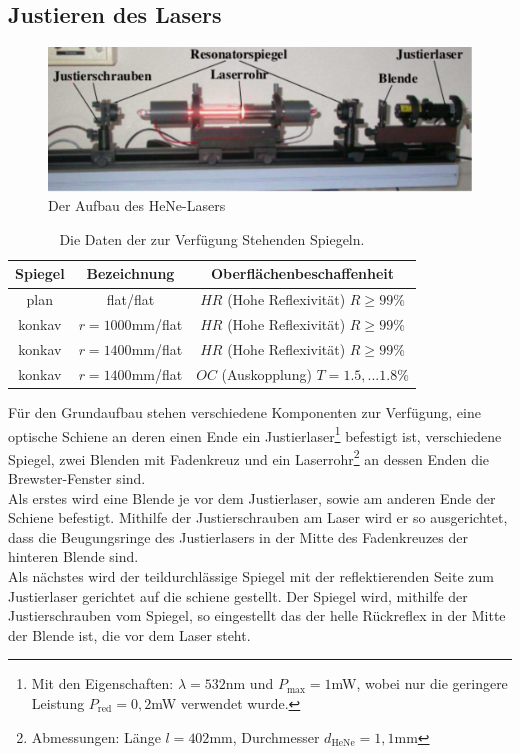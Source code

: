 \subsection{Justieren des Lasers}
\begin{figure}[h!]
\centering
\includegraphics[scale=0.75]{../Grafiken/Aufbau.pdf}
\caption{Der Aufbau des HeNe-Lasers\cite{V61}}\label{Aufbau}
\end{figure}
\FloatBarrier
\begin{table}[h!]
\centering
\begin{tabular}{c c c}
Spiegel & Bezeichnung & Oberflächenbeschaffenheit \\\hline
plan & flat/flat & $HR$ (Hohe Reflexivität) $R\ge 99\%$\\
konkav & $r=1000$mm/flat & $HR$ (Hohe Reflexivität) $R\ge 99\%$\\
konkav & $r=1400$mm/flat & $HR$ (Hohe Reflexivität) $R\ge 99\%$\\
konkav & $r=1400$mm/flat & $OC$ (Auskopplung) $T=1.5,...1.8\% $
\end{tabular}
\caption{Die Daten der zur Verfügung Stehenden Spiegeln.\cite{V61}\label{Eigenschaften}}
\end{table}
\FloatBarrier
Für den Grundaufbau stehen verschiedene Komponenten zur Verfügung, eine optische Schiene an deren einen Ende ein Justierlaser\footnote{Mit den Eigenschaften: $\lambda=532$nm und $P_{\text{max}}=1$mW, wobei nur die geringere Leistung $P_{\text{red}}=0,2$mW verwendet wurde.} befestigt ist, verschiedene Spiegel, zwei Blenden mit Fadenkreuz und ein Laserrohr\footnote{Abmessungen: Länge $l=402$mm, Durchmesser $d_{\text{HeNe}}=1,1$mm} an dessen Enden die Brewster-Fenster sind.\\ 
Als erstes wird eine Blende je vor dem Justierlaser, sowie am anderen Ende der Schiene befestigt. Mithilfe der Justierschrauben am Laser wird er so ausgerichtet, dass die Beugungsringe des Justierlasers in der Mitte des Fadenkreuzes der hinteren Blende sind.\\
Als nächstes wird der teildurchlässige Spiegel mit der reflektierenden Seite zum Justierlaser gerichtet auf die schiene gestellt. Der Spiegel wird, mithilfe der Justierschrauben vom Spiegel, so eingestellt das der helle Rückreflex in der Mitte der Blende ist, die vor dem Laser steht.\\ 
